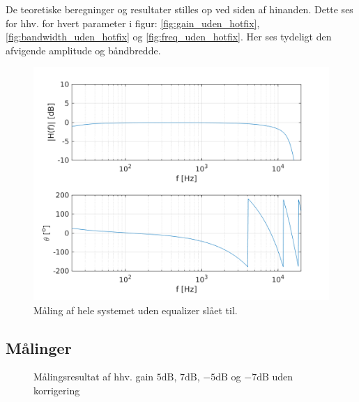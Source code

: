 De teoretiske beregninger og resultater stilles op ved siden af hinanden.
Dette ses for hhv. for hvert parameter i figur: \ref{fig:gain_uden_hotfix}, \ref{fig:bandwidth_uden_hotfix} og \ref{fig:freq_uden_hotfix}. 
Her ses tydeligt den afvigende amplitude og båndbredde.

\begin{figure}[h!]
	\centering
	\includegraphics[scale = 0.8]{matlabdemo/test/test_eq_off.png}  
	\caption{Måling af hele systemet uden equalizer slået til.}
	\label{fig:eq_off1}
\end{figure}

\subsection{Målinger}

\begin{figure}[h!]
	\centering
  	\caption{Målingsresultat af hhv. gain $5\si{\dB}$, $7\si{\dB}$, $-5\si{\dB}$ og $-7\si{\dB}$ uden korrigering}
	\label{fig:gain}
\end{figure}

